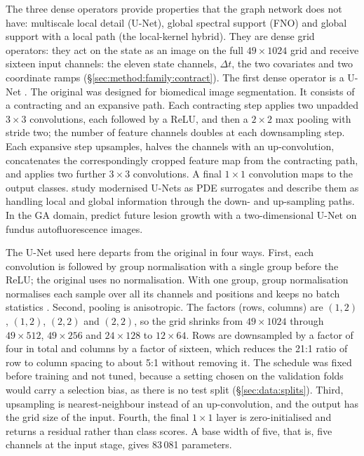 The three dense operators provide properties that the graph network does
not have: multiscale local detail (U-Net), global spectral support (FNO)
and global support with a local path (the local-kernel hybrid).
They are dense grid operators: they act
on the state as an image on the full $49 \times 1024$ grid and receive
sixteen input channels: the eleven state channels, $\Delta t$, the two
covariates and two coordinate ramps (\S\ref{sec:method:family:contract}). The first
dense operator is a U-Net \citep{Ronneberger2015}. The
original was designed for biomedical image segmentation. It consists of a
contracting and an expansive path. Each contracting step applies two
unpadded $3 \times 3$ convolutions, each followed by a ReLU, and then a
$2 \times 2$ max pooling with stride two; the number of feature channels
doubles at each downsampling step. Each expansive step upsamples, halves the
channels with an up-convolution, concatenates the correspondingly cropped
feature map from the contracting path, and applies two further $3 \times 3$
convolutions. A final $1 \times 1$ convolution maps to the output classes.
\citet{Gupta2023} study modernised U-Nets as PDE surrogates and
describe them as handling local and global information through
the down- and up-sampling paths.
In the GA domain, \citet{Salvi2025} predict future lesion growth with a
two-dimensional U-Net on fundus autofluorescence images.

The U-Net used here departs from the original in four ways. First, each
convolution is followed by group normalisation with a single group before
the ReLU; the original uses no normalisation.
With one group, group normalisation normalises each sample over all its
channels and positions and keeps no batch statistics \citep{Wu2018}. Second, pooling
is anisotropic. The factors (rows, columns) are $(1, 2)$, $(1, 2)$,
$(2, 2)$ and $(2, 2)$, so the grid shrinks from $49 \times 1024$ through
$49 \times 512$, $49 \times 256$ and $24 \times 128$ to $12 \times 64$. Rows
are downsampled by a factor of four in total and columns by a factor of
sixteen, which reduces the 21:1 ratio of row to column spacing to about
5:1 without removing it. The schedule was fixed before training and not
tuned, because a setting chosen on the validation folds would carry a
selection bias, as there is no test split (\S\ref{sec:data:splits}). Third, upsampling is nearest-neighbour instead of an
up-convolution, and the output has the grid size of the input. Fourth, the
final $1 \times 1$ layer is zero-initialised and returns a residual rather
than class scores. A base width of five, that is, five channels at the
input stage, gives 83\,081 parameters.

